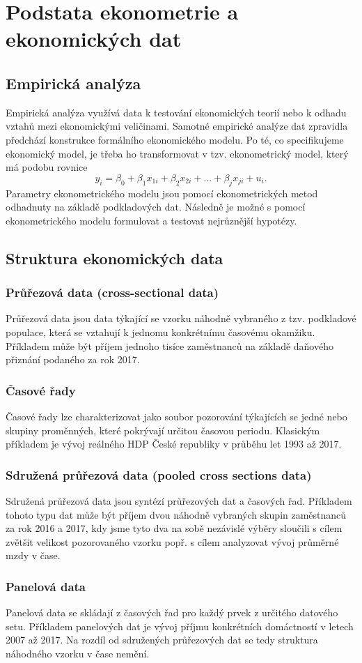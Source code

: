 \chapter{Podstata ekonometrie a ekonomických dat}

\section{Empirická analýza}

Empirická analýza využívá data k testování ekonomických teorií nebo k odhadu vztahů mezi ekonomickými 
veličinami. Samotné empirické analýze dat zpravidla předchází konstrukce formálního ekonomického 
modelu. Po té, co specifikujeme ekonomický model, je třeba ho transformovat v tzv. ekonometrický model, který má 
podobu rovnice
\begin{equation}
y_i = \beta_0 + \beta_1 x_{1i} + \beta_2 x_{2i} + ... + \beta_j x_{ji} + u_i.
\end{equation}
Parametry ekonometrického modelu jsou pomocí ekonometrických metod odhadnuty na základě podkladových dat. 
Následně je možné s pomocí ekonometrického modelu formulovat a testovat nejrůznější hypotézy.

\section{Struktura ekonomických data}

\subsection{Průřezová data (cross-sectional data)}
Průřezová data jsou data týkající se vzorku náhodně vybraného z tzv. podkladové populace, která se vztahují k 
jednomu konkrétnímu časovému okamžiku. Příkladem může být příjem jednoho tisíce 
zaměstnanců na základě daňového přiznání podaného za rok 2017.

\subsection{Časové řady}
Časové řady lze charakterizovat jako soubor pozorování týkajících se jedné nebo skupiny proměnných, které 
pokrývají určitou časovou periodu. Klasickým příkladem je vývoj reálného HDP České republiky v 
průběhu let 1993 až 2017.

\subsection{Sdružená průřezová data (pooled cross sections data)}
Sdružená průřezová data jsou syntézí průřezových dat a časových řad. Příkladem tohoto typu dat může 
být příjem dvou náhodně vybraných skupin zaměstnanců za rok 2016 a 2017, kdy jsme tyto dva na sobě 
nezávislé výběry sloučili s cílem zvětšit velikost pozorovaného vzorku popř. s cílem analyzovat vývoj průměrné mzdy v čase.

\subsection{Panelová data}
Panelová data se skládají z časových řad pro každý prvek z určitého datového setu. Příkladem panelových dat je 
vývoj příjmu konkrétních domáctností v letech 2007 až 2017. Na rozdíl od sdružených průřezových 
dat se tedy struktura náhodného vzorku v čase nemění.
